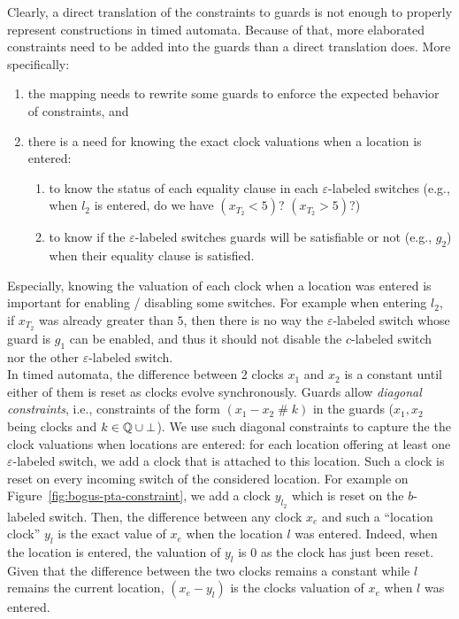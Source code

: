 Clearly, a direct translation of the constraints to guards is not enough to properly represent \MInvoke constructions in timed automata. Because of that, more elaborated constraints need to be added into the guards than a direct translation does. More specifically:
\begin{enumerate}

	\item the mapping needs to rewrite some guards to enforce the expected behavior of \MInvoke constraints, and 
	
	\item there is a need for knowing the exact clock valuations when a location is entered:
	\begin{enumerate}
	
		\item to know the status of each equality clause in each $\varepsilon$-labeled switches (e.g., when $l_2$ is entered, do we have $(x_{T_2} < 5)$? $(x_{T_2} > 5)$?)
		
		\item to know if the $\varepsilon$-labeled switches guards will be satisfiable or not (e.g., $g_2$) when their equality clause is satisfied.
	
	\end{enumerate}

\end{enumerate}
Especially, knowing the valuation of each clock when a location was entered is important for enabling / disabling some switches. For example when entering $l_2$, if $x_{T_2}$ was already greater than $5$, then there is no way the $\varepsilon$-labeled switch whose guard is $g_1$ can be enabled, and thus it should not disable the $c$-labeled switch nor the other $\varepsilon$-labeled switch. \\

In timed automata, the difference between 2 clocks $x_1$ and $x_2$ is a constant until either of them is reset as clocks evolve synchronously. Guards allow \emph{diagonal constraints}, i.e., constraints of the form $(x_1 - x_2 \;\#\; k)$ in the guards ($x_1, x_2$ being clocks and $k \in \mathbb{Q} \cup{ \perp }$). We use such diagonal constraints to capture the the clock valuations when locations are entered: for each location offering at least one $\varepsilon$-labeled switch, we add a clock that is attached to this location. Such a clock is reset on every incoming switch of the considered location. For example on Figure~\ref{fig:bogus-pta-constraint}, we add a clock $y_{l_2}$ which is reset on the $b$-labeled switch. Then, the difference between any clock $x_e$ and such a ``location clock'' $y_l$ is the exact value of $x_e$ when the location $l$ was entered. Indeed, when the location is entered, the valuation of $y_l$ is 0 as the clock has just been reset. Given that the difference between the two clocks remains a constant while $l$ remains the current location, $(x_e - y_l)$ is the clocks valuation of $x_e$ when $l$ was entered.\\

